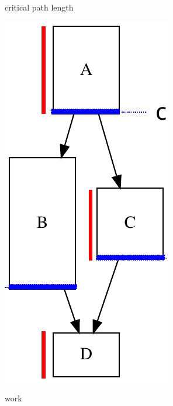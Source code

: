 \documentclass[12pt,dvipdfmx]{beamer}
\begin{document}
\begin{frame}[fragile]
\begin{columns}
\begin{column}{0.3\textwidth}
\begin{center}
\vskip-2mm

{\footnotesize critical path length}

\vskip3mm

\includegraphics[width=\textwidth]{out/pdf/svg/dag_work.pdf}

\vskip-2mm

{\footnotesize work}
\end{center}
\end{column}
\end{columns}

\end{frame}
\end{document}
